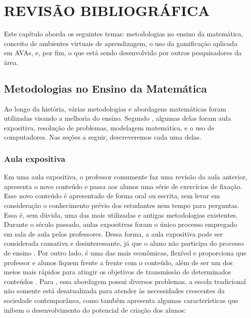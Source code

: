 \chapter{REVISÃO BIBLIOGRÁFICA}
\label{cap:fundamentacao-teorica}

Este capítulo aborda os seguintes temas: metodologias no ensino da matemática, conceito de ambientes virtuais de aprendizagem, o uso da gamificação aplicada em AVAs, e, por fim, o que está sendo 
desenvolvido por outros pesquisadores da área.

\section{Metodologias no Ensino da Matemática}

Ao longo da história, várias metodologias e abordagens matemáticas foram utilizadas visando a melhoria do ensino. Segundo , algumas delas foram aula expositiva, 
resolução de problemas, modelagem matemática, e o uso de computadores. Nas seções a seguir, descreveremos cada uma delas.

\subsection{Aula expositiva}

Em uma aula expositiva, o professor comumente faz uma revisão da aula anterior, apresenta o novo conteúdo e passa aos alunos uma 
série de exercícios de fixação. Esse novo conteúdo é apresentado de forma oral ou escrita, sem levar em consideração o conhecimento 
prévio dos estudantes nem tempo para perguntas. Essa é, sem dúvida, uma das mais utilizadas e antigas metodologias existentes. Durante 
o século passado, aulas expositivas foram o único processo empregado em sala de aula pelos professores. Dessa forma, a aula expositiva pode 
ser considerada cansativa e desinteressante, já que o aluno não participa do processo de ensino  \cite{hammes2003tendencias}. Por outro 
lado, \'e uma das mais econômicas, flexível e proporciona que professor e alunos fiquem frente a frente com o conteúdo, além de ser um dos 
meios mais rápidos para atingir os objetivos de transmissão de determinados conteúdos \cite{marconteorias}. Para 
, essa abordagem possui diversos problemas, a escola tradicional não somente está desatualizada para atender às 
necessidades crescentes da sociedade contemporânea, como também apresenta algumas características que inibem o desenvolvimento do potencial 
de criação dos alunos:

